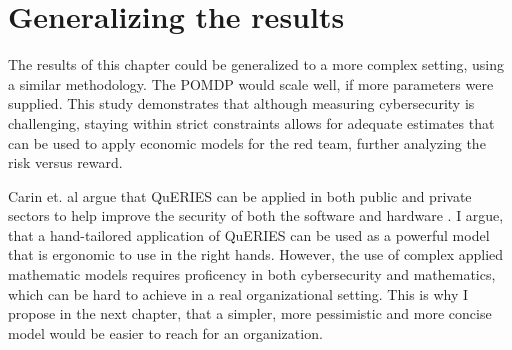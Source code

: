 \section{Generalizing the results}

The results of this chapter could be generalized to a more complex
setting, using a similar methodology. The POMDP would scale well, if
more parameters were supplied. This study demonstrates that although
measuring cybersecurity is challenging, staying within strict
constraints allows for adequate estimates that can be used to apply
economic models for the red team, further analyzing the risk versus
reward.
 
Carin et. al argue that QuERIES can be
applied in both public and private sectors to help improve the
security of both the software and hardware \cite{carin2008cybersecurity}. I argue, that a hand-tailored
application of QuERIES can be used as a powerful model that is
ergonomic to use in the right hands. However, the use of complex
applied mathematic models requires proficency in both cybersecurity and
mathematics, which can be hard to achieve in a real organizational
setting. This is why I propose in the next chapter, that a simpler, more pessimistic and more concise model would be easier to reach for an
organization.
